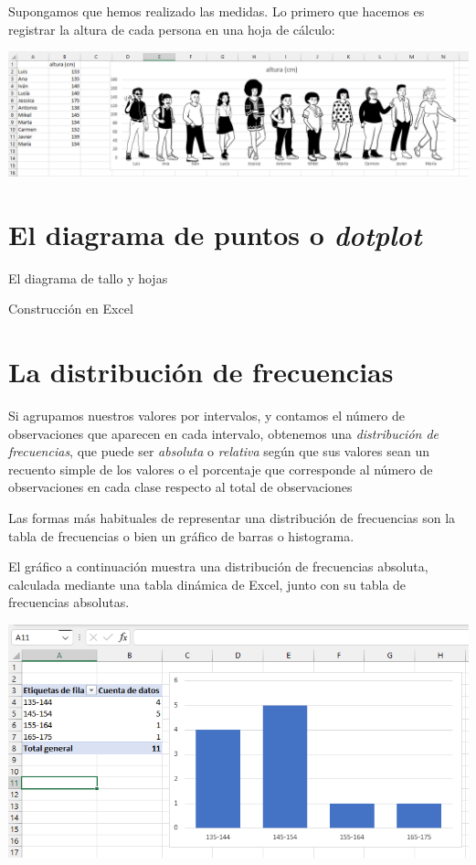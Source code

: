 \documentclass[
  letterpaper,
  DIV=11,
  numbers=noendperiod,
  oneside]{scrreprt}
\begin{document}
Supongamos que hemos realizado las medidas. Lo primero que hacemos es
registrar la altura de cada persona en una hoja de cálculo:

\includegraphics{01-imagenes/aula1(2).png}

\hypertarget{el-diagrama-de-puntos-o-dotplot}{%
\section{\texorpdfstring{El diagrama de puntos o
\emph{dotplot}}{El diagrama de puntos o dotplot}}\label{el-diagrama-de-puntos-o-dotplot}}

El diagrama de tallo y hojas

Construcción en Excel

\hypertarget{la-distribuciuxf3n-de-frecuencias}{%
\section{La distribución de
frecuencias}\label{la-distribuciuxf3n-de-frecuencias}}

Si agrupamos nuestros valores por intervalos, y contamos el número de
observaciones que aparecen en cada intervalo, obtenemos una
\emph{distribución de frecuencias}, que puede ser \emph{absoluta} o
\emph{relativa} según que sus valores sean un recuento simple de los
valores o el porcentaje que corresponde al número de observaciones en
cada clase respecto al total de observaciones

Las formas más habituales de representar una distribución de frecuencias
son la tabla de frecuencias o bien un gráfico de barras o histograma.

El gráfico a continuación muestra una distribución de frecuencias
absoluta, calculada mediante una tabla dinámica de Excel, junto con su
tabla de frecuencias absolutas.

\includegraphics{01-imagenes/image-20221115205524355.png}
\end{document}
